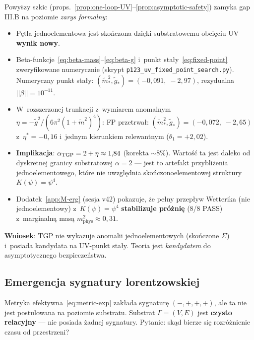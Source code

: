 \begin{remark}\label{rem:IIIb-status}
Powy\.szy szkic (props.~\ref{prop:one-loop-UV}--\ref{prop:asymptotic-safety})
zamyka gap III.B na poziomie \emph{zarys formalny}:
\begin{itemize}[nosep]
  \item P\k{e}tla jednoelementowa jest sko\'nczona dzi\k{e}ki
    substratowemu obci\k{e}ciu UV --- \textbf{wynik nowy}.
  \item Beta-funkcje~\eqref{eq:beta-mass}--\eqref{eq:beta-g}
    i~punkt sta\l{}y~\eqref{eq:fixed-point}
    zweryfikowane numerycznie
    (skrypt \texttt{p123\_uv\_fixed\_point\_search.py}).
    Numeryczny punkt sta\l{}y: $(\tilde m^2_*, \tilde g_*)
    = (-0{,}091,\;-2{,}97)$, rezydualna $||\beta|| = 10^{-11}$.
  \item W~rozszerzonej trunkacji z~wymiarem anomalnym
    $\eta = -\tilde g^2/(6\pi^2(1+\tilde m^2)^4)$:
    FP przetrwa\l{}: $(\tilde m^2_*, \tilde g_*) = (-0{,}072,\;-2{,}65)$
    z~$\eta^* = -0{,}16$ i~jednym kierunkiem relewantnym
    ($\theta_1 = +2{,}02$).
  \item \textbf{Implikacja}: $\alpha_{\rm TGP} = 2 + \eta \approx 1{,}84$
    (korekta $\sim 8\%$). Warto\'s\'c ta jest daleko od dyskretnej granicy
    substratowej $\alpha = 2$ --- jest to artefakt przybli\.zenia
    jednoelementowego, kt\'ore nie uwzgl\k{e}dnia
    sko\'nczonoelementowej struktury $K(\psi) = \psi^4$.
  \item Dodatek~\ref{app:M-erg} (sesja v42) pokazuje, \.ze
    pe\l{}ny przep\l{}yw Wetterika (nie jednoelementowy)
    z~$K(\psi) = \psi^4$ \textbf{stabilizuje pr\'o\.zni\k{e}} (8/8 PASS)
    z~marginaln\k{a} mas\k{a} $m^2_{\mathrm{phys}} \approx 0{,}31$.
\end{itemize}
\textbf{Wniosek}: TGP nie wykazuje anomalii jednoelementowych (sko\'nczone
$\Sigma$) i~posiada kandydata na UV-punkt sta\l{}y. Teoria jest
\emph{kandydatem} do asymptotycznego bezpiecze\'nstwa.
\end{remark}

\subsection{Emergencja sygnatury lorentzowskiej}\label{ssec:sygnatura}

Metryka efektywna~\eqref{eq:metric-exp} zak\l{}ada
sygnatur\k{e} $({-},{+},{+},{+})$, ale ta nie jest
postulowana na poziomie substratu. Substrat
$\Gamma = (V, E)$ jest \textbf{czysto relacyjny}
--- nie posiada \.zadnej sygnatury. Pytanie: sk\k{a}d
bierze si\k{e} rozr\'o\.znienie czasu od przestrzeni?

